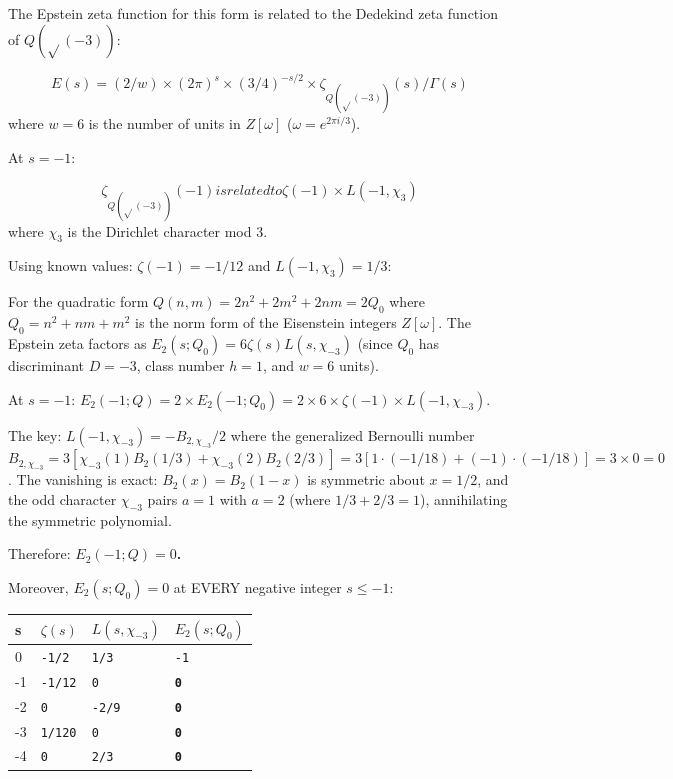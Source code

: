 \documentclass[aps,prd,preprint,superscriptaddress,longbibliography,floatfix]{revtex4-2}
\theoremstyle{remark}
\begin{document}
The Epstein zeta function for this form is related to the Dedekind zeta function of $Q(\sqrt{}(-3))$:


\begin{equation}
    E(s) = (2/w) \times (2\pi)^s \times (3/4)^{-s/2} \times \zeta_{Q(\sqrt{}(-3))}(s) / \Gamma(s)
\end{equation}
where $w = 6$ is the number of units in $Z[\omega]$ ($\omega = e^{2\pi i/3}$).

At $s = -1$:


\begin{equation}
    \zeta_{Q(\sqrt{}(-3))}(-1) is related to \zeta(-1) \times L(-1, \chi_{3})
\end{equation}
where $\chi_{3}$ is the Dirichlet character mod 3.

Using known values: $\zeta(-1) = -1/12$ and $L(-1, \chi_{3}) = 1/3$:

For the quadratic form $Q(n,m) = 2n^{2} + 2m^{2} + 2nm = 2Q_{0}$ where $Q_{0} = n^{2} + nm + m^{2}$ is the norm form of the Eisenstein integers $Z[\omega]$. The Epstein zeta factors as $E_{2}(s; Q_{0}) = 6 \zeta(s) L(s, \chi_{-3})$ (since $Q_{0}$ has discriminant $D = -3$, class number $h = 1$, and $w = 6$ units).

At $s = -1$: $E_{2}(-1; Q) = 2 \times E_{2}(-1; Q_{0}) = 2 \times 6 \times \zeta(-1) \times L(-1, \chi_{-3})$.

The key: $L(-1, \chi_{-3}) = -B_{2,\chi_{-3}}/2$ where the generalized Bernoulli number $B_{2,\chi_{-3}} = 3[\chi_{-3}(1)B_{2}(1/3) + \chi_{-3}(2)B_{2}(2/3)] = 3[1\cdot(-1/18) + (-1)\cdot(-1/18)] = 3 \times 0 = 0$. The vanishing is exact: $B_{2}(x) = B_{2}(1-x)$ is symmetric about $x = 1/2$, and the odd character $\chi_{-3}$ pairs $a = 1$ with $a = 2$ (where $1/3 + 2/3 = 1$), annihilating the symmetric polynomial.

Therefore: \textbf{$E_{2}(-1; Q) = 0$.}

Moreover, $E_{2}(s; Q_{0}) = 0$ at EVERY negative integer $s \leq -1$:


\begin{table}[H]
\begin{ruledtabular}
\begin{tabular}{p{3.8cm}p{3.8cm}p{3.8cm}p{3.8cm}}
s & $\zeta(s)$ & $L(s, \chi_{-3})$ & $E_{2}(s; Q_{0})$ \\
\hline
0 & \texttt{-1/2} & \texttt{1/3} & \texttt{-1} \\
-1 & \texttt{-1/12} & \texttt{0} & \textbf{\texttt{0}} \\
-2 & \texttt{0} & \texttt{-2/9} & \textbf{\texttt{0}} \\
-3 & \texttt{1/120} & \texttt{0} & \textbf{\texttt{0}} \\
-4 & \texttt{0} & \texttt{2/3} & \textbf{\texttt{0}} \\
\end{tabular}
\end{ruledtabular}
\end{table}
\end{document}
